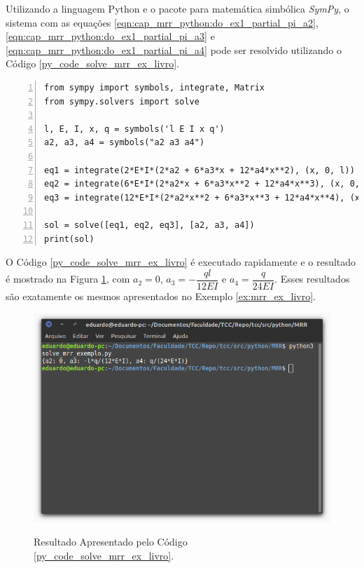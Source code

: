 \documentclass[
	12pt,				%
	openright,			%
    twoside,			%
	a4paper,			%
	english,			%
	french,				%
	spanish,			%
	brazil				%
	]{abntex2}
\numberwithin{lema}{chapter}
\numberwithin{teorema}{chapter}
\numberwithin{definicao}{chapter}
\numberwithin{exemplo}{chapter}
\numberwithin{figure}{chapter}
\begin{document}
Utilizando a linguagem Python e o pacote para matemática simbólica \textit{SymPy}, o sistema com as equações \eqref{eqn:cap_mrr_python:do_ex1_partial_pi_a2}, \eqref{eqn:cap_mrr_python:do_ex1_partial_pi_a3} e \eqref{eqn:cap_mrr_python:do_ex1_partial_pi_a4} pode ser resolvido utilizando o Código \ref{py_code_solve_mrr_ex_livro}.

\begin{lstlisting}[style=Python, xleftmargin=2em, numbers=left, caption={Código para a resolução do Exemplo \ref{ex:mrr_ex_livro}}, captionpos=t, label=py_code_solve_mrr_ex_livro]
from sympy import symbols, integrate, Matrix
from sympy.solvers import solve

l, E, I, x, q = symbols('l E I x q')
a2, a3, a4 = symbols("a2 a3 a4")

eq1 = integrate(2*E*I*(2*a2 + 6*a3*x + 12*a4*x**2), (x, 0, l)) - integrate(q*x**2 - q*l*x, (x, 0, l))
eq2 = integrate(6*E*I*(2*a2*x + 6*a3*x**2 + 12*a4*x**3), (x, 0, l)) - integrate(q*x**3 - q*(l**2)*x, (x, 0, l))
eq3 = integrate(12*E*I*(2*a2*x**2 + 6*a3*x**3 + 12*a4*x**4), (x, 0, l)) - integrate(q*x**4 - q*(l**3)*x, (x, 0, l))

sol = solve([eq1, eq2, eq3], [a2, a3, a4])
print(sol)
\end{lstlisting}

O Código \ref{py_code_solve_mrr_ex_livro} é executado rapidamente e o resultado é mostrado na Figura \ref{fig:code_solve_mrr_exemplo_livro}, com $a_2=0$, $a_3=-\dfrac{ql}{12EI}$ e $a_4=\dfrac{q}{24EI}$. Esses resultados são exatamente os mesmos apresentados no Exemplo \ref{ex:mrr_ex_livro}.

\begin{figure}[h]
	\caption{Resultado Apresentado pelo Código \ref{py_code_solve_mrr_ex_livro}.}
	\centering
	\includegraphics[scale=0.6]{../figuras/code/code_solve_mrr_exemplo_livro.png}
	\label{fig:code_solve_mrr_exemplo_livro}
\end{figure}
\end{document}
